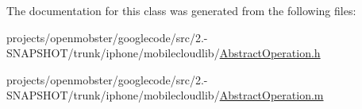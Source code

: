 \-The documentation for this class was generated from the following files\-:\begin{DoxyCompactItemize}
\item 
projects/openmobster/googlecode/src/2.-\/\-S\-N\-A\-P\-S\-H\-O\-T/trunk/iphone/mobilecloudlib/\hyperlink{_abstract_operation_8h}{\-Abstract\-Operation.\-h}\item 
projects/openmobster/googlecode/src/2.-\/\-S\-N\-A\-P\-S\-H\-O\-T/trunk/iphone/mobilecloudlib/\hyperlink{_abstract_operation_8m}{\-Abstract\-Operation.\-m}\end{DoxyCompactItemize}
